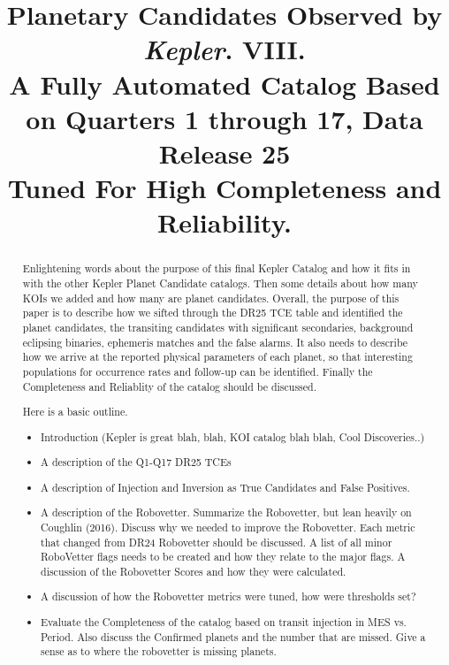\documentclass[apj,twocolappendix,numberedappendix]{emulateapj}
\renewcommand{\_}{\discretionary{\underscore}{}{\underscore}}  %
\newcommand\Kepler{\textit{Kepler}}
\begin{document}

\title{Planetary Candidates Observed by \Kepler. VIII.\\
A Fully Automated Catalog Based on Quarters 1 through 17, Data Release 25\\Tuned For High Completeness and Reliability. }



\begin{abstract}
Enlightening words about the purpose of this final Kepler Catalog and how it fits in with the other Kepler Planet Candidate catalogs. Then some details about how many KOIs we added and how many are planet candidates. 
Overall, the purpose of this paper is to describe how we sifted through the DR25 TCE table and identified the planet candidates, the transiting candidates with significant secondaries, background eclipsing binaries, ephemeris matches and the false alarms. It also needs to describe how we arrive at the reported physical parameters of each planet, so that interesting populations for occurrence rates and follow-up can be identified.  Finally the Completeness and Reliablity of the catalog should be discussed.


Here is a basic outline.
\begin{itemize}
\item Introduction  (Kepler is great blah, blah, KOI catalog blah blah, Cool Discoveries..)

\item A description of the Q1-Q17 DR25 TCEs

\item A description of Injection and Inversion as True Candidates and False Positives.

\item A description of the Robovetter. Summarize the Robovetter, but lean heavily on Coughlin (2016). Discuss why we needed to improve the Robovetter.  Each metric that changed from DR24 Robovetter should be discussed. A list of all minor RoboVetter flags needs to be created and how they relate to the major flags. A discussion of the Robovetter Scores and how they were calculated.

\item A discussion of how the Robovetter metrics were tuned, how were thresholds set? 

\item Evaluate the Completeness of the catalog based on transit injection in MES vs. Period. Also discuss the Confirmed planets and the number that are missed. Give a sense as to where the robovetter is missing planets.


\end{itemize}
\end{abstract}
\end{document}
